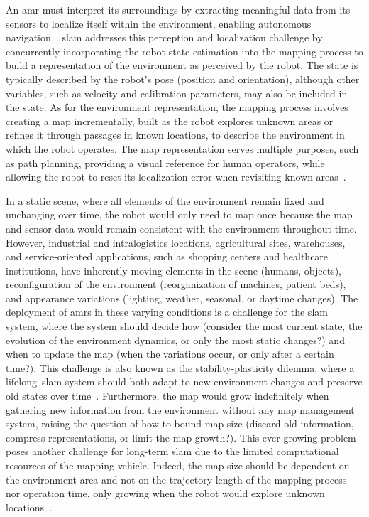 An \gls{amr} must interpret its surroundings by extracting meaningful data from
its sensors to localize itself within the environment, enabling autonomous
navigation~\cite{siegwart:book:2004}.
\gls{slam} addresses this perception and localization challenge by concurrently
incorporating the robot state estimation into the mapping process to build a
representation of the environment as perceived by the robot.
The state is typically described by the robot's pose (position and orientation),
although other variables, such as velocity and calibration parameters, may also
be included in the state. As for the environment representation, the mapping
process involves creating a map incrementally, built as the robot explores
unknown areas or refines it through passages in known locations, to describe
the environment in which the robot operates. The map representation serves
multiple purposes, such as path planning, providing a visual reference for
human operators, while allowing the robot to reset its localization error when
revisiting known areas~\cite{cadena:tro:2016}.

In a static scene, where all elements of the environment remain fixed and
unchanging over time, the robot would only need to map once because the map and
sensor data would remain consistent with the environment throughout time.
However, industrial and intralogistics locations, agricultural sites,
warehouses, and service-oriented applications, such as shopping centers and
healthcare institutions, have inherently moving elements in the scene
(humans, objects), reconfiguration of the environment
(reorganization of machines, patient beds), and appearance variations
(lighting, weather, seasonal, or daytime changes).
The deployment of \glspl{amr} in these varying conditions is a challenge for
the \gls{slam} system, where the system should decide how (consider the most
current state, the evolution of the environment dynamics, or only the most
static changes?) and when to update the map (when the variations occur, or only
after a certain time?). This challenge is also known as the stability-plasticity
dilemma, where a lifelong~\gls{slam} system should both adapt to new environment
changes and preserve old states over time~\cite{biber-duckett:ijrr:2009}.
Furthermore, the map would grow indefinitely when gathering new information from
the environment without any map management system, raising the question of how
to bound map size (discard old information, compress representations, or limit
the map growth?). This ever-growing problem
poses another challenge for long-term \gls{slam} due to the
limited computational resources of the mapping vehicle. Indeed, the map size
should be dependent on the environment area and not on the trajectory length of
the mapping process nor operation time, only growing when the robot would
explore unknown locations~\cite{kretzschmar-stachniss:ijrr:2012}.

